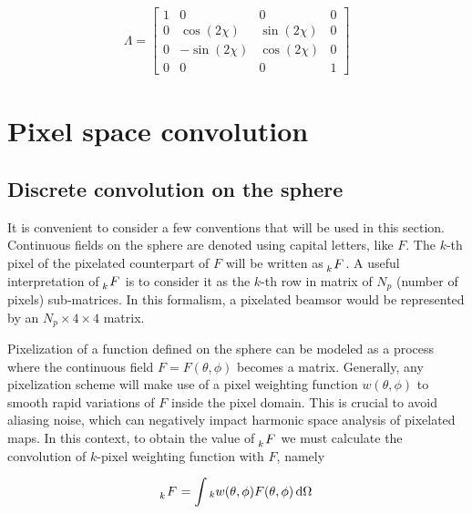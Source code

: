 \documentclass[a4paper,fleqn]{cas-dc}\sloppy
\begin{document}
	\begin{equation}
	\begin{aligned}
	\Lambda =
	\begin{bmatrix}
	1  & 0 & 0 & 0\\
	0  & \cos(2\chi) & \sin(2\chi) & 0\\
	0  &-\sin(2\chi) & \cos(2\chi) & 0\\
	0  & 0 & 0 & 1
	\end{bmatrix}
	\end{aligned}
	\label{eq::lambda_operator}
	\end{equation}
	
	\section{Pixel space convolution}
	\label{sec::pixel_conv}
	
	\subsection{Discrete convolution on the sphere}
	
	It is convenient to consider a few conventions that will be used in this section. Continuous fields on the sphere are denoted using capital letters, like $F$. The $k$-th pixel of the pixelated counterpart of $F$ will be written as $\tensor[_k]{F}{}$. A useful interpretation of $\tensor[_k]{F}{}$ is to consider it as the $k$-th row in matrix of $N_p$ (number of pixels) sub-matrices. In this formalism, a pixelated beamsor would be represented by an $N_p \times 4 \times 4$ matrix.
	
	Pixelization of a function defined on the sphere can be modeled as a process where the continuous field $F = F(\theta,\phi)$ becomes a matrix. Generally, any pixelization scheme will make use of a pixel weighting function $w(\theta,\phi)$ to smooth rapid variations of $F$ inside the pixel domain. This is crucial to avoid aliasing noise, which can negatively impact harmonic space analysis of pixelated maps. In this context, to obtain the value of $\tensor[_k]{F}{}$ we must calculate the convolution of $k$-pixel weighting function with $F$, namely 
	
	\begin{equation}
	\begin{aligned}
	\tensor[_k]{F}{} = \int {}_k w (\theta,\phi) F(\theta,\phi) \, \mathrm{d} \Omega
	\end{aligned}
	\label{eq::howtopixelate}
	\end{equation}
	
\end{document}
